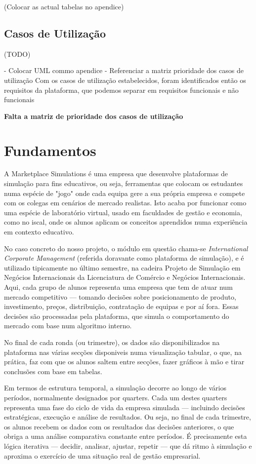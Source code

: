(Colocar as actual tabelas no apendice)


\subsection{Casos de Utilização}
(TODO)

- Colocar UML commo apendice
- Referenciar a matriz prioridade dos casos de utilização
Com os casos de utilização estabelecidos, foram identificados então os requisitos da plataforma, que podemos separar em requisitos funcionais e não funcionais

\textbf{ Falta a matriz de prioridade dos casos de utilização}

\section{Fundamentos}
\label{sec:fundamentos}

A Marketplace Simulations  é uma empresa que desenvolve plataformas de simulação para fins educativos, ou seja, ferramentas que colocam os estudantes numa espécie de "jogo" onde cada equipa gere a sua própria empresa e compete com os colegas em cenários de mercado realistas. Isto acaba por funcionar como uma espécie de laboratório virtual, usado em faculdades de gestão e economia, como no \gls{iscal}, onde os alunos aplicam os conceitos aprendidos numa experiência em contexto educativo.

No caso concreto do nosso projeto, o módulo em questão chama-se \textit{International Corporate Management} (referida doravante como plataforma de simulação), e é utilizado tipicamente no último semestre, na cadeira Projeto de Simulação em Negócios Internacionais  da Licenciatura de Comércio e Negócios Internacionais. Aqui, cada grupo de alunos representa uma empresa que tem de atuar num mercado competitivo — tomando decisões sobre posicionamento de produto, investimento, preços, distribuição, contratação de equipas e por aí fora. Essas decisões são processadas pela plataforma, que simula o comportamento do mercado com base num algoritmo interno. 

No final de cada ronda (ou trimestre), os dados são disponibilizados na plataforma nas várias secções disponiveis numa visualização tabular, o que, na prática, faz com que os alunos saltem entre secções, fazer gráficos à mão e tirar conclusões com base em tabelas.

Em termos de estrutura temporal, a simulação decorre ao longo de vários períodos, normalmente designados por quarters. Cada um destes quarters representa uma fase do ciclo de vida da empresa simulada — incluindo decisões estratégicas, execução e análise de resultados. Ou seja, no final de cada trimestre, os alunos recebem os dados com os resultados das decisões anteriores, o que obriga a uma análise comparativa constante entre períodos. É precisamente esta lógica iterativa — decidir, analisar, ajustar, repetir — que dá ritmo à simulação e aproxima o exercício de uma situação real de gestão empresarial.



